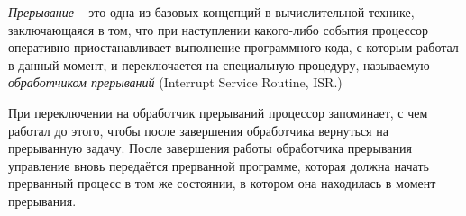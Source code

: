 \documentclass[../sparc.tex]{subfiles}
\begin{document}

\emph{Прерывание} -- это одна из базовых концепций в вычислительной технике,
заключающаяся в том, что при наступлении какого-либо события процессор
оперативно приостанавливает выполнение программного кода, с которым работал в
данный момент, и переключается на специальную процедуру, называемую
\emph{обработчиком прерываний} (Interrupt Service Routine, ISR.)

При переключении на обработчик прерываний процессор запоминает, с чем работал до
этого, чтобы после завершения обработчика вернуться на прерыванную задачу. После
завершения работы обработчика прерывания управление вновь передаётся прерванной
программе, которая должна начать прерванный процесс в том же состоянии, в
котором она находилась в момент прерывания.\cite[452-456]{tanenbaum2021-ru}
\end{document}
